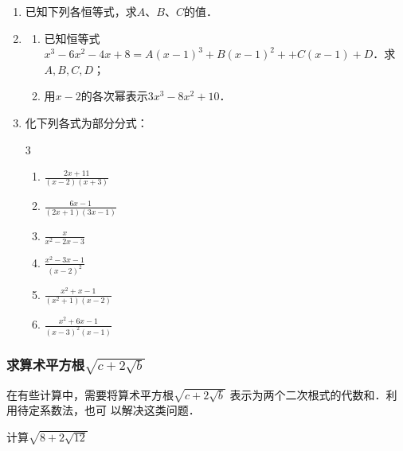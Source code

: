 \begin{ex}
\begin{enumerate}
    \item  已知下列各恒等式，求$A$、$B$、$C$的值．
    \begin{enumerate}
    \end{enumerate}
    \item \begin{enumerate}
        \item 已知恒等式$x^3-6x^2-4x+8=A(x-1)^3+B(x-1)^2+
        +C(x-1)+D$．求$A,B,C,D$；
        \item 用$x-2$的各次幂表示$3x^3-8x^2+10$．
    \end{enumerate}

    \item 化下列各式为部分分式：
    \begin{multicols}{3}
        \begin{enumerate}
    \item $\frac{2x+11}{(x-2)(x+3)}$
    \item $\frac{6x-1}{(2x+1)(3x-1)}$
    \item $\frac{x}{x^2-2x-3}$
    \item $\frac{x^2-3x-1}{(x-2)^2}$
    \item $\frac{x^2+x-1}{(x^2+1)(x-2)}$
    \item $\frac{x^2+6x-1}{(x-3)^2(x-1)}$
\end{enumerate}
    \end{multicols}
\end{enumerate}
    
\end{ex}

\subsubsection{求算术平方根$\sqrt{c+2\sqrt{b}}$}
在有些计算中，需要将算术平方根$\sqrt{c+2\sqrt{b}}$
表示为两个二次根式的代数和．利用待定系数法，也可
以解决这类问题．

\begin{example}
计算$\sqrt{8+2\sqrt{12}}$
\end{example}

